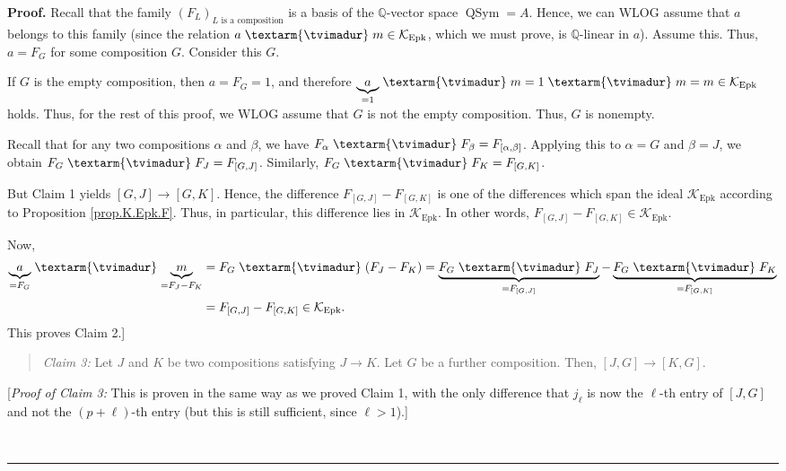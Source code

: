 \documentclass[numbers=enddot,12pt,final,onecolumn,notitlepage]{scrartcl}%
\theoremstyle{definition}
\newenvironment{statement}{\begin{quote}}{\end{quote}}
\newenvironment{proof}[1][Proof]{\noindent\textbf{#1.} }{\ \rule{0.5em}{0.5em}}
\newenvironment{verlong}{}{}
\newcommand{\tvi}{\left. \textarm{\tvimadur} \right.}
\begin{document}
\begin{verlong}
\begin{proof}
Recall that the family $\left(  F_{L}\right)  _{L\text{ is a composition}}$ is
a basis of the $\mathbb{Q}$-vector space $\operatorname*{QSym}=A$. Hence, we
can WLOG assume that $a$ belongs to this family (since the relation
$a\tvi  m\in\mathcal{K}_{\operatorname*{Epk}}$, which we must prove, is
$\mathbb{Q}$-linear in $a$). Assume this. Thus, $a=F_{G}$ for some composition
$G$. Consider this $G$.

If $G$ is the empty composition, then $a=F_{G}=1$, and therefore
$\underbrace{a}_{=1}\tvi  m=1\tvi  m=m\in\mathcal{K}_{\operatorname*{Epk}}$
holds. Thus, for the rest of this proof, we WLOG assume that $G$ is not the
empty composition. Thus, $G$ is nonempty.

Recall that for any two compositions $\alpha$ and $\beta$, we have $F_{\alpha
}\tvi  F_{\beta}=F_{\left[  \alpha,\beta\right]  }$. Applying this to
$\alpha=G$ and $\beta=J$, we obtain $F_{G}\tvi  F_{J}=F_{\left[  G,J\right]
}$. Similarly, $F_{G}\tvi  F_{K}=F_{\left[  G,K\right]  }$.

But Claim 1 yields $\left[  G,J\right]  \rightarrow\left[  G,K\right]  $.
Hence, the difference $F_{\left[  G,J\right]  }-F_{\left[  G,K\right]  }$ is
one of the differences which span the ideal $\mathcal{K}_{\operatorname*{Epk}%
}$ according to Proposition \ref{prop.K.Epk.F}. Thus, in particular, this
difference lies in $\mathcal{K}_{\operatorname*{Epk}}$. In other words,
$F_{\left[  G,J\right]  }-F_{\left[  G,K\right]  }\in\mathcal{K}%
_{\operatorname*{Epk}}$.

Now,%
\begin{align*}
\underbrace{a}_{=F_{G}}\tvi \underbrace{m}_{=F_{J}-F_{K}}  &  =F_{G}%
\tvi \left(  F_{J}-F_{K}\right)  =\underbrace{F_{G}\tvi F_{J}}_{=F_{\left[
G,J\right]  }}-\underbrace{F_{G}\tvi F_{K}}_{=F_{\left[  G,K\right]  }}\\
&  =F_{\left[  G,J\right]  }-F_{\left[  G,K\right]  }\in\mathcal{K}%
_{\operatorname*{Epk}}.
\end{align*}
This proves Claim 2.]

\begin{statement}
\textit{Claim 3:} Let $J$ and $K$ be two compositions satisfying $J\rightarrow
K$. Let $G$ be a further composition. Then, $\left[  J,G\right]
\rightarrow\left[  K,G\right]  $.
\end{statement}

[\textit{Proof of Claim 3:} This is proven in the same way as we proved Claim
1, with the only difference that $j_{\ell}$ is now the $\ell$-th entry of
$\left[  J,G\right]  $ and not the $\left(  p+\ell\right)  $-th entry (but
this is still sufficient, since $\ell>1$).]


\end{proof}
\end{verlong}
\end{document}
